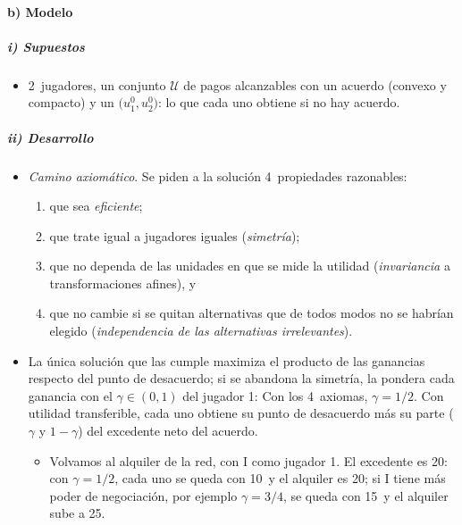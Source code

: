 \documentclass[11pt]{article}
\begin{document}
\paragraph{b) Modelo}

\subparagraph{i) Supuestos}

\begin{itemize}
\item 2~jugadores, un conjunto $\mathcal{U}$ de pagos alcanzables con un acuerdo (convexo y compacto) y un  $\big(u_1^0,u_2^0\big)$: lo que cada uno obtiene si no hay acuerdo.
\end{itemize}

\subparagraph{ii) Desarrollo}

\begin{itemize}
\item \emph{Camino axiomático}\nocite{Nash1950Bargaining}. Se piden a la solución 4~propiedades razonables:
  \begin{enumerate}
  \item que sea \emph{eficiente};
  \item que trate igual a jugadores iguales (\emph{simetría});
  \item que no dependa de las unidades en que se mide la utilidad (\emph{invariancia} a transformaciones afines), y
  \item que no cambie si se quitan alternativas que de todos modos no se habrían elegido (\emph{independencia de las alternativas irrelevantes}).
  \end{enumerate}
\item La única solución que las cumple maximiza el producto de las ganancias respecto del punto de desacuerdo; si se abandona la simetría, la  pondera cada ganancia con el  $\gamma\in(0,1)$ del jugador 1:
  Con los 4~axiomas, $\gamma=1/2$. Con utilidad transferible, cada uno obtiene su punto de desacuerdo más su parte ($\gamma$ y $1-\gamma$) del excedente neto del acuerdo.
  \begin{itemize}
  \item Volvamos al alquiler de la red, con \textup{I} como jugador 1. El excedente es 20: con $\gamma=1/2$, cada uno se queda con 10~y el alquiler es 20; si \textup{I} tiene más poder de negociación, por ejemplo $\gamma=3/4$, se queda con 15~y el alquiler sube a 25.

\end{itemize}
\end{itemize}
\end{document}
